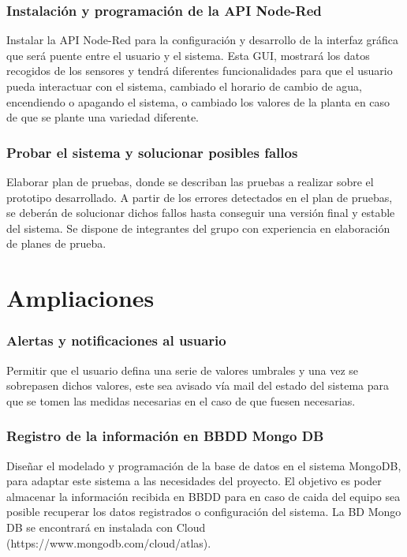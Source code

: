 \documentclass[12pt,a4paper,titlepage,oneside]{report}
\begin{document}
	
	\subsection*{Instalación y programación de la API Node-Red}
	Instalar la API Node-Red para la configuración y desarrollo de la interfaz gráfica que será puente entre el usuario y el sistema. Esta GUI, mostrará los datos recogidos de los sensores y tendrá diferentes funcionalidades para que el usuario pueda interactuar con el sistema, cambiado el horario de cambio de agua, encendiendo o apagando el sistema, o cambiado los valores de la planta en caso de que se plante una variedad diferente.
	
	\subsection*{Probar el sistema y solucionar posibles fallos}
	Elaborar plan de pruebas, donde se describan las pruebas a realizar sobre el prototipo desarrollado. A partir de los errores detectados en el plan de pruebas, se deberán de solucionar dichos fallos hasta conseguir una versión final y estable del sistema.
Se dispone de integrantes del grupo con experiencia en elaboración de planes de prueba.
	

\chapter{Ampliaciones}

\subsection*{Alertas y notificaciones al usuario}
	Permitir que el usuario defina una serie de valores umbrales y una vez se sobrepasen dichos valores, este sea avisado vía mail del estado del sistema para que se tomen las medidas necesarias en el caso de que fuesen necesarias.

	\subsection*{Registro de la información en BBDD Mongo DB}
	Diseñar el modelado y programación de la base de datos en el sistema MongoDB, para adaptar este sistema a las necesidades del proyecto. El objetivo es poder almacenar la información recibida en BBDD para en caso de caida del equipo sea posible recuperar los datos registrados o configuración del sistema. La BD Mongo DB se encontrará en instalada con Cloud (https://www.mongodb.com/cloud/atlas).
\end{document}
